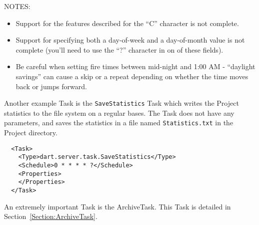 \documentclass{InsightBook}
\begin{document}
NOTES:
\begin{itemize}
    \item Support for the features described for the ``C'' character is not complete.
    \item Support for specifying both a day-of-week and a day-of-month value is not complete (you'll need to use the ``?'' character in on of these fields).
    \item Be careful when setting fire times between mid-night and
1:00 AM - ``daylight savings'' can cause a skip or a repeat depending on
whether the time moves back or jumps forward.
\end{itemize}

Another example Task is the \texttt{SaveStatistics} Task which writes
the Project statistics to the file system on a regular bases.  The Task
does not have any parameters, and saves the statistics in a file named
\texttt{Statistics.txt} in the Project directory.
\begin{verbatim}
  <Task>
    <Type>dart.server.task.SaveStatistics</Type>
    <Schedule>0 * * * * ?</Schedule>
    <Properties>
    </Properties>
  </Task>
\end{verbatim}


An extremely important Task is the ArchiveTask.  This Task is detailed
in Section~\ref{Section:ArchiveTask}.
\end{document}
